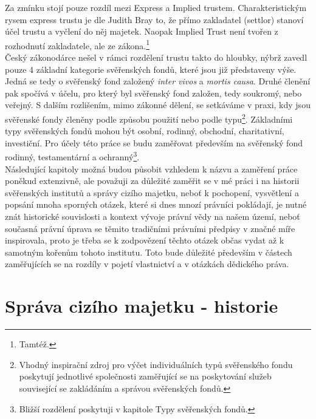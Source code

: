 \documentclass{article}
\begin{document}
\newpage

Za zmínku stojí pouze rozdíl mezi Express a Implied trustem. Charakteristickým rysem express trustu je dle Judith Bray to, že přímo zakladatel (settlor) stanoví účel trustu a vyčlení do něj majetek. Naopak Implied Trust není tvořen z rozhodnutí zakladatele, ale ze zákona.\footnote{Tamtéž.}\\

Český zákonodárce nešel v rámci rozdělení trustu takto do hloubky, nýbrž zavedl pouze 4 základní kategorie svěřenských fondů, které jsou již představeny výše. Jedná se tedy o svěřenský fond založený \textit{inter vivos} a \textit{mortis causa}. Druhé členění pak spočívá v účelu, pro který byl svěřenský fond založen, tedy soukromý, nebo veřejný. S dalším rozlišením, mimo zákonné dělení, se setkáv\-áme v praxi, kdy jsou svěřenské fondy členěny podle způsobu použití nebo podle typu\footnote{Vhodný inspirační zdroj pro výčet individuálních typů svěřenského fondu poskytují jednotlivé společnosti zaměřující se na poskytování služeb související se zakládáním a správou svěřenských fondů.}. Základními typy svěřenských fondů mohou být osobní, rodinný, obchodní, charitativní, investiční. Pro účely této práce se budu zaměřovat především na svěřenský fond rodinný, testamentární a ochranný\footnote{Bližší rozdělení poskytuji v kapitole Typy svěřenských fondů.}.\\

Následující kapitoly možná budou působit vzhledem k názvu a zaměření práce poněkud extenzivně, ale považuji za důležité zaměřit se v mé práci i na historii svěřenských institutů a správy cizího majetku, neboť k pochopení, vysvětlení a popsání mnoha sporných otázek, které si dnes mnozí právníci pokládají, je nutné znát historické souvislosti a kontext vývoje právní vědy na našem území, neboť současná právní úprava se těmito tradičními právními předpisy v značné míře inspirovala, proto je třeba se k zodpovězení těchto otázek občas vydat až k samotným kořenům tohoto institutu. Toto bude důležité především v částech zaměřujících se na rozdíly v pojetí vlastnictví a v otázkách dědického práva.\\


\newpage

\section{Správa cizího majetku - historie}
\end{document}
